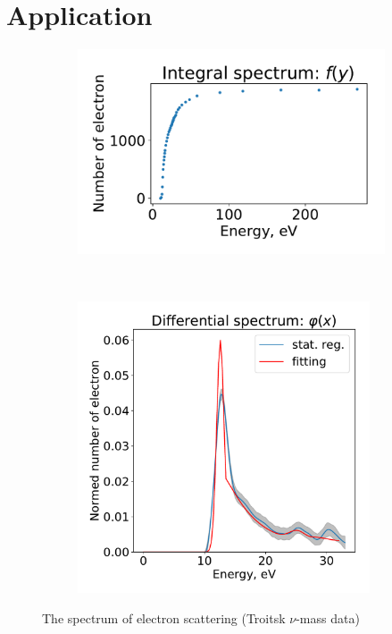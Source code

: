 \documentclass{webofc}
\begin{document}
\section{Application}

\begin{figure}[ht!]
	\begin{subfigure}[b]{0.5\textwidth}
    	\includegraphics[width=0.95\linewidth]{image/fig01}
        \caption{}
        \label{pic-01-a}
    \end{subfigure}
	~
    \begin{subfigure}[b]{0.5\textwidth}
		\includegraphics[width=0.95\textwidth]{image/fig02}
        \caption{}
        \label{pic-01-b}
    \end{subfigure}
    \caption{The spectrum of electron scattering (Troitsk $\nu$-mass data)}
\end{figure}
\end{document}
